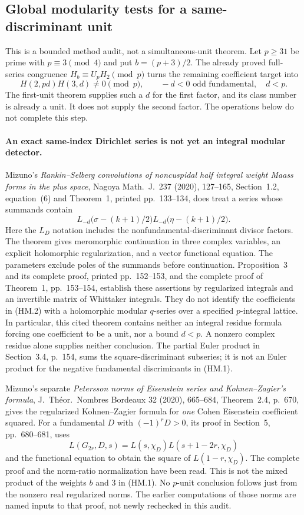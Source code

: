 \subsection{Global modularity tests for a same-discriminant unit}
\label{sec:hadamard-modularity-scope}

This is a bounded method audit, not a simultaneous-unit theorem.  Let
$p\ge31$ be prime with $p\equiv3\pmod4$ and put $b=(p+3)/2$.
The already proved full-series congruence
$H_b\equiv U_pH_2\pmod p$ turns the remaining coefficient target into
\[
 H(2,pd)H(3,d)\ne0\pmod p,
 \qquad -d<0\text{ odd fundamental},\quad d<p.
 \tag{HM.1}
\]
The first-unit theorem supplies such a $d$ for the first factor, and its
class number is already a unit.  It does not supply the second factor.
The operations below do not complete this step.

\paragraph{An exact same-index Dirichlet series is not yet an integral
modular detector.}
Mizuno's \emph{Rankin--Selberg convolutions of noncuspidal half integral
weight Maass forms in the plus space}, Nagoya Math.\ J.\ 237 (2020),
127--165, Section~1.2, equation~(6) and Theorem~1, printed pp.~133--134,
does treat a series whose summands contain
\[
 L_{-d}\bigl(\sigma-(k+1)/2\bigr)
 L_{-d}\bigl(\eta-(k+1)/2\bigr).
 \tag{HM.2}
\]
Here the $L_D$ notation includes the nonfundamental-discriminant divisor
factors.  The theorem gives meromorphic continuation in three complex
variables, an explicit holomorphic regularization, and a vector functional
equation.  The parameters exclude poles of the summands before continuation.
Proposition~3 and its complete proof, printed pp.~152--153, and the
complete proof of Theorem~1, pp.~153--154, establish these assertions by
regularized integrals and an invertible matrix of Whittaker integrals.
They do not identify the coefficients in (HM.2) with a holomorphic
modular $q$-series over a specified $p$-integral lattice.  In particular,
this cited theorem contains neither an integral residue formula forcing
one coefficient to be a unit, nor a bound $d<p$.  A nonzero complex
residue alone supplies neither conclusion.  The partial Euler product
in Section~3.4, p.~154, sums the square-discriminant subseries; it is not
an Euler product for the negative fundamental discriminants in (HM.1).

Mizuno's separate \emph{Petersson norms of Eisenstein series and
Kohnen--Zagier's formula}, J.\ Th\'eor.\ Nombres Bordeaux 32 (2020), 665--684,
Theorem~2.4, p.~670, gives the regularized Kohnen--Zagier formula for
\emph{one} Cohen Eisenstein coefficient squared.  For a fundamental $D$
with $(-1)^rD>0$, its proof in Section~5, pp.~680--681, uses
\[
 L(G_{2r},D,s)=L(s,\chi_D)L(s+1-2r,\chi_D)
 \tag{HM.3}
\]
and the functional equation to obtain the square of $L(1-r,\chi_D)$.
The complete proof and the norm-ratio normalization have been read.
This is not the mixed product of the weights $b$ and $3$ in (HM.1).
No $p$-unit conclusion follows just from the nonzero real regularized
norms.  The earlier computations of those norms are named inputs to
that proof, not newly rechecked in this audit.

